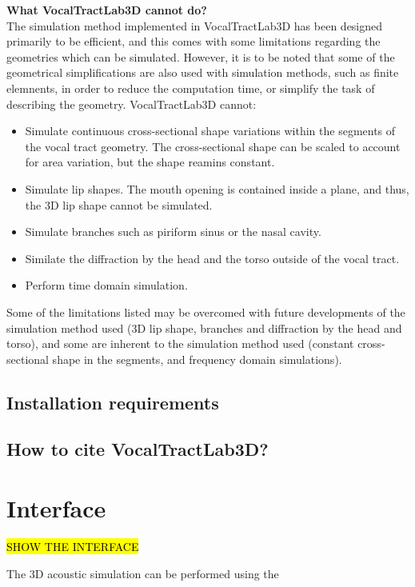 \documentclass[]{article}
\begin{document}
	\textbf{What VocalTractLab3D cannot do?} \\
	The simulation method implemented in VocalTractLab3D has been 
	designed primarily to be efficient, and this comes with some 
	limitations regarding the geometries which can be simulated.
	However, it is to be noted that some of the geometrical simplifications are also used with simulation methods, such as finite
	elemnents, in order to reduce the computation time, or simplify the task of describing the geometry.
	VocalTractLab3D cannot:
	\begin{itemize}
		\item Simulate continuous cross-sectional shape variations within the segments of the vocal tract geometry. The cross-sectional shape can be scaled to account for area variation, but the shape reamins constant.
		\item Simulate lip shapes. The mouth opening is contained 
		inside a plane, and thus, the 3D lip shape cannot be simulated.
		\item Simulate branches such as piriform sinus or the nasal 
		cavity.
		\item Similate the diffraction by the head and the torso outside
		of the vocal tract.
		\item Perform time domain simulation.
	\end{itemize}
	Some of the limitations listed may be overcomed with future developments of the simulation method used (3D lip shape, branches 
	and diffraction by the head and torso), and some are inherent to 
	the simulation method used (constant cross-sectional shape in the 
	segments, and frequency domain simulations).
	
	\subsection{Installation requirements}
	
	\subsection{How to cite VocalTractLab3D?}
	
	\section{Interface}
	
	\hl{SHOW THE INTERFACE}
	
	The 3D acoustic simulation can be performed using the 
	
	
\end{document}

